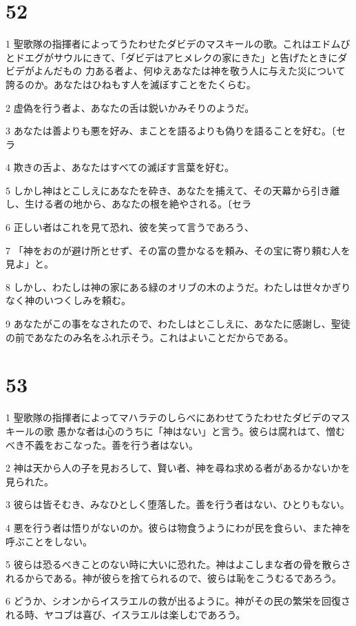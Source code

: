 \chapter{52}

\par 1 聖歌隊の指揮者によってうたわせたダビデのマスキールの歌。これはエドムびとドエグがサウルにきて、「ダビデはアヒメレクの家にきた」と告げたときにダビデがよんだもの 力ある者よ、何ゆえあなたは神を敬う人に与えた災について誇るのか。あなたはひねもす人を滅ぼすことをたくらむ。
\par 2 虚偽を行う者よ、あなたの舌は鋭いかみそりのようだ。
\par 3 あなたは善よりも悪を好み、まことを語るよりも偽りを語ることを好む。〔セラ
\par 4 欺きの舌よ、あなたはすべての滅ぼす言葉を好む。
\par 5 しかし神はとこしえにあなたを砕き、あなたを捕えて、その天幕から引き離し、生ける者の地から、あなたの根を絶やされる。〔セラ
\par 6 正しい者はこれを見て恐れ、彼を笑って言うであろう、
\par 7 「神をおのが避け所とせず、その富の豊かなるを頼み、その宝に寄り頼む人を見よ」と。
\par 8 しかし、わたしは神の家にある緑のオリブの木のようだ。わたしは世々かぎりなく神のいつくしみを頼む。
\par 9 あなたがこの事をなされたので、わたしはとこしえに、あなたに感謝し、聖徒の前であなたのみ名をふれ示そう。これはよいことだからである。

\chapter{53}

\par 1 聖歌隊の指揮者によってマハラテのしらべにあわせてうたわせたダビデのマスキールの歌 愚かな者は心のうちに「神はない」と言う。彼らは腐れはて、憎むべき不義をおこなった。善を行う者はない。
\par 2 神は天から人の子を見おろして、賢い者、神を尋ね求める者があるかないかを見られた。
\par 3 彼らは皆そむき、みなひとしく堕落した。善を行う者はない、ひとりもない。
\par 4 悪を行う者は悟りがないのか。彼らは物食うようにわが民を食らい、また神を呼ぶことをしない。
\par 5 彼らは恐るべきことのない時に大いに恐れた。神はよこしまな者の骨を散らされるからである。神が彼らを捨てられるので、彼らは恥をこうむるであろう。
\par 6 どうか、シオンからイスラエルの救が出るように。神がその民の繁栄を回復される時、ヤコブは喜び、イスラエルは楽しむであろう。

